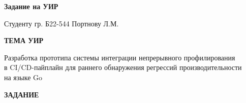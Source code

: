 
\pzletterhead

\vspace{0.5cm}
\begin{center}
{\fontsize{17.2}{20}\selectfont\bfseries Задание на УИР}

\vspace{0.35cm}
{\fontsize{14.3}{17}\selectfont Студенту гр. Б22-544 Портнову Л.М.}

\vspace{0.5cm}
{\fontsize{14.3}{17}\selectfont\bfseries ТЕМА УИР}

\vspace{0.35cm}
{\fontsize{17.2}{20}\selectfont
Разработка прототипа системы интеграции непрерывного профилирования\\
в CI/CD-пайплайн для раннего обнаружения регрессий производительности\\
на языке Go}

\vspace{0.5cm}
{\fontsize{14.3}{17}\selectfont\bfseries ЗАДАНИЕ}
\end{center}


